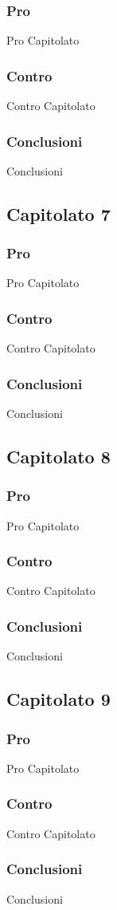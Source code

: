 \subsubsection{Pro}
Pro Capitolato

\subsubsection{Contro}
Contro Capitolato

\subsubsection{Conclusioni}
Conclusioni

\subsection{Capitolato 7}

\subsubsection{Pro}
Pro Capitolato

\subsubsection{Contro}
Contro Capitolato

\subsubsection{Conclusioni}
Conclusioni

\subsection{Capitolato 8}

\subsubsection{Pro}
Pro Capitolato

\subsubsection{Contro}
Contro Capitolato

\subsubsection{Conclusioni}
Conclusioni

\subsection{Capitolato 9}

\subsubsection{Pro}
Pro Capitolato

\subsubsection{Contro}
Contro Capitolato

\subsubsection{Conclusioni}
Conclusioni
